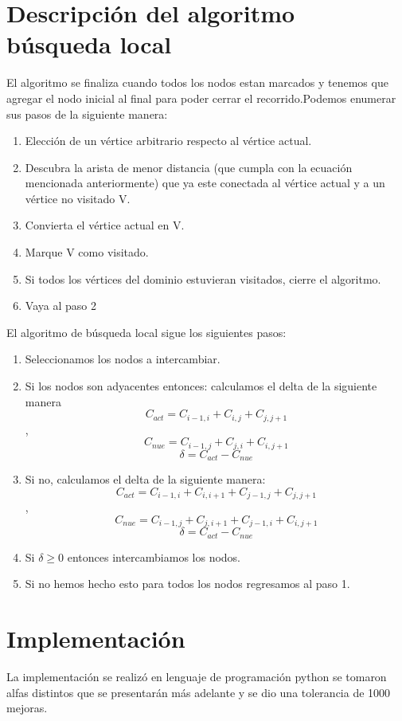 \documentclass{article}
\theoremstyle{mytheoremstyle}
\theoremstyle{mytheoremstyle}
\theoremstyle{myproblemstyle}
\begin{document}
    \section{Descripción del algoritmo búsqueda local}
    El algoritmo se finaliza cuando todos los nodos estan marcados y tenemos que agregar el nodo inicial al final para poder cerrar el recorrido.Podemos enumerar sus pasos de la siguiente manera:
    \begin{enumerate}
    	\item Elección de un vértice arbitrario respecto al vértice actual.
    	\item Descubra la arista de menor distancia (que cumpla con la ecuación mencionada anteriormente) que ya este conectada al vértice actual y a un vértice no visitado V.
    	\item Convierta el vértice actual en V.
    	\item Marque V como visitado.
    	\item Si todos los vértices del dominio estuvieran visitados, cierre el algoritmo.
    	\item Vaya al paso 2
    \end{enumerate}
    El algoritmo de búsqueda local sigue los siguientes pasos:
    \begin{enumerate}
    	\item Seleccionamos los nodos a intercambiar.
    	\item Si los nodos son adyacentes entonces: calculamos el delta de la siguiente manera $$C_{act} = C_{i-1,i}+C_{i,j}+C_{j,j+1}$$, $$C_{nue} = C_{i-1,j}+C_{j,i}+C_{i,j+1}$$ $$\delta = C_{act} - C_{nue}$$
    	\item Si no, calculamos el delta de la siguiente manera: $$C_{act} = C_{i-1,i}+C_{i,i+1}+C_{j-1,j}+C_{j,j+1}$$, $$C_{nue} = C_{i-1,j}+C_{j,i+1}+C_{j-1,i}+C_{i,j+1}$$ $$\delta = C_{act} - C_{nue}$$
    	\item Si $\delta \geq 0$ entonces intercambiamos los nodos.
    	\item Si no hemos hecho esto para todos los nodos regresamos al paso 1. 
    \end{enumerate}
    \section{Implementación} 
   	La implementación se realizó en lenguaje de programación python se tomaron alfas distintos que se presentarán más adelante y se dio una tolerancia de 1000 mejoras.
    
\end{document}
